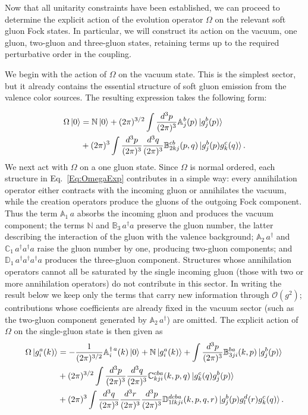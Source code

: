 \documentclass[a4paper,11pt]{article}
\def\mf#1{\mathbb{#1}}
\begin{document}
Now that all unitarity constraints have been established, we can proceed to determine the explicit action of the evolution operator $\Omega$ on the relevant soft gluon Fock states. In particular, we will construct its action on the vacuum, one gluon, two-gluon and three-gluon states, retaining terms up to the required perturbative order in the coupling.

We begin with the action of $\Omega$ on the vacuum state. This is the simplest sector, but it already contains the essential structure of soft gluon emission from the valence color sources. The resulting expression takes the following form:

\begin{align} \label{eq:Omegaonvacmom1}
    \Omega\ket{0} & = \mf{N}\ket{0}
    +(2\pi)^{3/2}\int \frac{d^3p}{(2\pi)^3}\mf{A}^{b}_{j}(p)
    \ket{g^{b}_{j}(p)} \notag \\ & 
    +(2\pi)^{3}\int \frac{d^3p}{(2\pi)^3} \frac{d^3q}{(2\pi)^3}  \mf{B}^{cb}_{2kj}(p,q)\ket{g^{b}_{j}(p)g^{c}_{k}(q)}.
\end{align}
We next act with $\Omega$ on a one gluon state. Since $\Omega$ is normal ordered, each structure in Eq.~\eqref{Eq:OmegaExp} contributes in a simple way: every annihilation operator either contracts with the incoming gluon or annihilates the vacuum, while the creation operators produce the gluons of the outgoing Fock component. Thus the term $\mf{A}_{1}\,a$ absorbs the incoming gluon and produces the vacuum component; the terms $\mf{N}$ and $\mf{B}_{3}\,a^{\dagger}a$ preserve the gluon number, the latter describing the interaction of the gluon with the valence background; $\mf{A}_{2}\,a^{\dagger}$ and $\mf{C}_{1}\,a^{\dagger}a^{\dagger}a$ raise the gluon number by one, producing two-gluon components; and $\mf{D}_{1}\,a^{\dagger}a^{\dagger}a^{\dagger}a$ produces the three-gluon component. Structures whose annihilation operators cannot all be saturated by the single incoming gluon (those with two or more annihilation operators) do not contribute in this sector. In writing the result below we keep only the terms that carry new information through $\mathcal{O}(g^{2})$; contributions whose coefficients are already fixed in the vacuum sector (such as the two-gluon component generated by $\mf{A}_{2}\,a^{\dagger}$) are omitted. The explicit action of $\Omega$ on the single-gluon state is then given as
\begin{align}\label{eq:Omegaongmom}
    \Omega\ket{g^{a}_{i}(k)} & =  -\frac{1}{(2\pi)^{3/2}} \mf{A}^{\dagger\, a}_{i}(k)\ket{0}
   + \mf{N}\ket{g^{a}_{i}(k)} 
    +\int  \frac{d^3p}{(2\pi)^3} \mf{B} ^{ba}_{3ji}(k,p)\ket{g^{b}_{j}(p)} \notag \\ &  
    + (2\pi)^{3/2}\int \frac{d^3p}{(2\pi)^3}\frac{d^3q}{(2\pi)^3} \mf{C}^{cba}_{kji}(k,p,q)\ket{g^{c}_{k}(q)g^{b}_{j}(p)}  \notag \\ & + (2\pi)^{3} \int \frac{d^3 q}{(2\pi)^3} \frac{d^3r}{(2\pi)^3} \frac{d^3p}{(2\pi)^3}  \mf{D}^{dcba}_{1lkji}(k,p,q,r) \ket{g^{b}_{j}(p)g^{d}_{l}(r)g^{c}_{k}(q)}.
\end{align}
\end{document}
